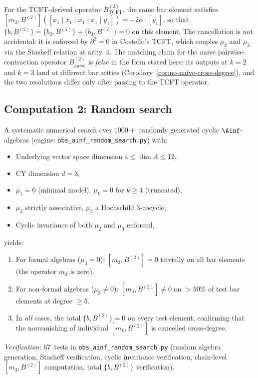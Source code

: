 \begin{remark}
\label{rem:b2-cancellation}
For the TCFT-derived operator $B^{(2)}_{\mathrm{TCFT}}$, the
same bar element satisfies
$[m_2, B^{(2)}]([x_1 \mid x_1 \mid x_1 \mid x_1 \mid y_1])
= -2\alpha \cdot [y_1]$, so that
$\{b, B^{(2)}\} = \{b_2, B^{(2)}\} + \{b_3, B^{(2)}\} = 0$
on this element.  The cancellation is not accidental: it is
enforced by $\partial^2 = 0$ in Costello's TCFT, which couples
$\mu_2$ and $\mu_3$ via the Stasheff relation at arity~$4$.
The matching claim for the naive pairwise-contraction
operator $B^{(2)}_{\mathrm{naive}}$ is \emph{false} in the form
stated here: its outputs at $k = 2$ and $k = 3$ land at
different bar arities (Corollary~\ref{cor:no-naive-cross-degree}),
and the two resolutions differ only after passing to the TCFT
operator.
\end{remark}


\subsection{Computation 2: Random search}
\label{subsec:comp-random}

\begin{computation}
\label{comp:random-search}
A systematic numerical search over $1000+$ randomly generated
cyclic $\Ainf$-algebras (engine:
\texttt{obs\_ainf\_random\_search.py}) with:
\begin{itemize}
 \item Underlying vector space dimension $4 \leq \dim A \leq 12$,
 \item CY dimension $d = 3$,
 \item $\mu_1 = 0$ (minimal model), $\mu_k = 0$ for $k \geq 4$
  (truncated),
 \item $\mu_2$ strictly associative, $\mu_3$ a Hochschild
  $3$-cocycle,
 \item Cyclic invariance of both $\mu_2$ and $\mu_3$ enforced,
\end{itemize}
yields:
\begin{enumerate}[label=\textup{(\roman*)}]
 \item For formal algebras ($\mu_3 = 0$):
  $[m_3, B^{(2)}] = 0$ trivially on all bar elements
  (the operator $m_3$ is zero).
 \item For non-formal algebras ($\mu_3 \neq 0$):
  $[m_3, B^{(2)}] \neq 0$ on $> 50\%$ of test bar elements
  at degree $\geq 5$.
 \item In \emph{all} cases, the total $\{b, B^{(2)}\} = 0$
  on every test element, confirming that the nonvanishing of
  individual $[m_k, B^{(2)}]$ is cancelled cross-degree.
\end{enumerate}

\noindent\textit{Verification}: $67$~tests in
\texttt{obs\_ainf\_random\_search.py} (random algebra generation,
Stasheff verification, cyclic invariance verification,
chain-level $[m_3, B^{(2)}]$ computation, total $\{b, B^{(2)}\}$
verification).
\end{computation}


